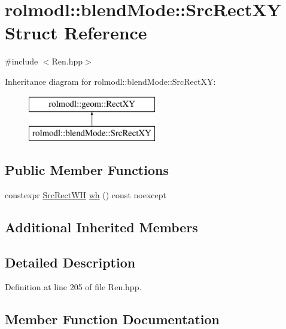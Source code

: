 \hypertarget{structrolmodl_1_1blend_mode_1_1_src_rect_x_y}{}\section{rolmodl\+::blend\+Mode\+::Src\+Rect\+XY Struct Reference}
\label{structrolmodl_1_1blend_mode_1_1_src_rect_x_y}


{\ttfamily \#include $<$Ren.\+hpp$>$}

Inheritance diagram for rolmodl\+::blend\+Mode\+::Src\+Rect\+XY\+:\begin{figure}[H]
\begin{center}
\leavevmode
\includegraphics[height=2.000000cm]{structrolmodl_1_1blend_mode_1_1_src_rect_x_y}
\end{center}
\end{figure}
\subsection*{Public Member Functions}
\begin{DoxyCompactItemize}
\item 
constexpr \mbox{\hyperlink{structrolmodl_1_1blend_mode_1_1_src_rect_w_h}{Src\+Rect\+WH}} \mbox{\hyperlink{structrolmodl_1_1blend_mode_1_1_src_rect_x_y_a4ec1a91ae8b27f91fa7f80acf6e15acd}{wh}} () const noexcept
\end{DoxyCompactItemize}
\subsection*{Additional Inherited Members}


\subsection{Detailed Description}


Definition at line 205 of file Ren.\+hpp.



\subsection{Member Function Documentation}
\mbox{\label{structrolmodl_1_1blend_mode_1_1_src_rect_x_y_a4ec1a91ae8b27f91fa7f80acf6e15acd}} 
